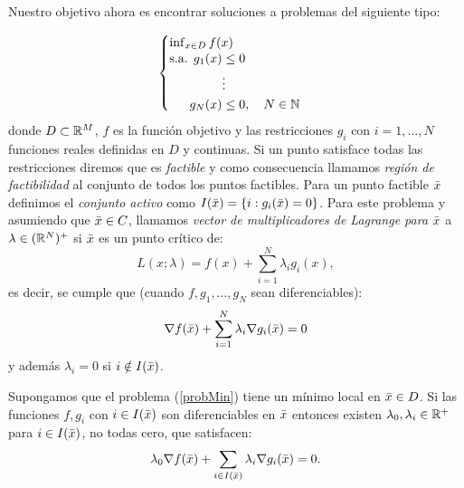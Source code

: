 	Nuestro objetivo ahora es encontrar soluciones a problemas del siguiente tipo:
	
		\begin{equation}\label{probMin}
		\begin{cases}
		\inf_{x\in D} f(x)\\
		\begin{split}
		\text{s.a. } g_1(x) &\leq 0 \\
		&\vdots \\
		g_N(x) &\leq 0, \quad N \in \mathbb{N}
		\end{split}
		
		\end{cases} 
		\end{equation}
		donde $ D \subset \mathbb{R}^M$, $ f  $ es la función objetivo y las restricciones $ g_i $ con $ i =1,\dots, N $ funciones reales definidas en $ D $ y continuas. Si un punto satisface todas las restricciones diremos que es \textit{factible}  y como consecuencia llamamos \textit{región de factibilidad} al conjunto de todos los puntos factibles. Para un punto factible $ \bar{x} $ definimos el \textit{conjunto activo} como $ I(\bar{x}) = \{i: g_i(\bar{x}) = 0\}$. Para este problema y asumiendo que $ \bar{x} \in C $, llamamos \textit{vector de multiplicadores de Lagrange para $ \bar{x} $} a $ \lambda \in (\mathbb{R}^N)^+ $ si $ \bar{x} $ es un punto crítico de:
		\[
		L(x;\lambda) = f(x) + \sum_{i=1}^{N} \lambda_i g_i(x),
		\]
		es decir, se cumple que (cuando $ f,g_1,\dots,g_N $ sean diferenciables):
		\[
		\nabla f(\bar{x}) + \sum_{i=1}^{N} \lambda_i \nabla g_i(\bar{x}) = 0
		\]
		y además $ \lambda_i = 0 $ si $ i \notin I(\bar{x}) $.
		\begin{teoremaBox}\label{FritzJohn}
			Supongamos que el problema (\ref{probMin}) tiene un mínimo local en $ \bar{x} \in D $. Si las funciones $ f, g_i $ con $ i \in I(\bar{x}) $ son diferenciables en $ \bar{x} $ entonces existen $ \lambda_0, \lambda_i \in \mathbb{R}^+ $ para $ i \in I(\bar{x}) $, no todas cero, que satisfacen:
			\[
			\lambda_0 \nabla f(\bar{x}) + \sum_{i \in I(\bar{x})} \lambda_i \nabla g_i(\bar{x}) = 0.
			\]
		\end{teoremaBox}
